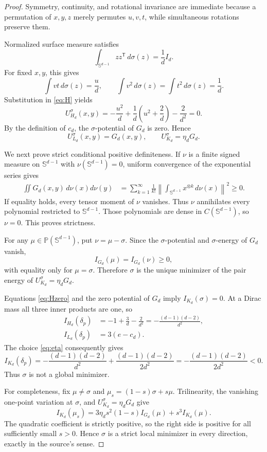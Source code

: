 \documentclass[11pt]{article}
\newcommand{\Sph}{\mathbb S^{d-1}}
\newcommand{\Pmeas}{\mathbb P}
\begin{document}
\begin{proof}
Symmetry, continuity, and rotational invariance are immediate because a
permutation of $x,y,z$ merely permutes $u,v,t$, while simultaneous rotations
preserve them.

Normalized surface measure satisfies
\[
 \int_{\Sph}zz^{\mathsf T}\,d\sigma(z)=\frac1dI_d.
\]
For fixed $x,y$, this gives
\[
 \int vt\,d\sigma(z)=\frac ud,
 \qquad
 \int v^2\,d\sigma(z)=\int t^2\,d\sigma(z)=\frac1d.
\]
Substitution in \eqref{eq:H} yields
\begin{equation}\label{eq:Hzero}
 U_{H_d}^\sigma(x,y)
 =-\frac{u^2}{d}+\frac1d\left(u^2+\frac2d\right)
  -\frac2{d^2}=0.
\end{equation}
By the definition of $c_d$, the $\sigma$-potential of $G_d$ is zero.  Hence
\[
 U_{L_d}^\sigma(x,y)=G_d(x,y),
 \qquad U_{K_d}^\sigma=\eta_dG_d.
\]

We next prove strict conditional positive definiteness.  If $\nu$ is a finite
signed measure on $\Sph$ with $\nu(\Sph)=0$, uniform convergence of the
exponential series gives
\begin{align}\label{eq:tensors}
 \iint G_d(x,y)\,d\nu(x)d\nu(y)
 &=\sum_{k=1}^{\infty}\frac1{k!}
   \left\|\int_{\Sph}x^{\otimes k}\,d\nu(x)\right\|^2\ge0.
\end{align}
If equality holds, every tensor moment of $\nu$ vanishes.  Thus $\nu$
annihilates every polynomial restricted to $\Sph$.  Those polynomials are
dense in $C(\Sph)$, so $\nu=0$.  This proves strictness.

For any $\mu\in\Pmeas(\Sph)$, put $\nu=\mu-\sigma$.  Since the
$\sigma$-potential and $\sigma$-energy of $G_d$ vanish,
\[
 I_{G_d}(\mu)=I_{G_d}(\nu)\ge0,
\]
with equality only for $\mu=\sigma$.  Therefore $\sigma$ is the unique
minimizer of the pair energy of $U_{K_d}^\sigma=\eta_dG_d$.

Equations \eqref{eq:Hzero} and the zero potential of $G_d$ imply
$I_{K_d}(\sigma)=0$.  At a Dirac mass all three inner products are one, so
\begin{align*}
 I_{H_d}(\delta_p)
 &=-1+\frac3d-\frac2{d^2}
   =-\frac{(d-1)(d-2)}{d^2},\\
 I_{L_d}(\delta_p)&=3(e-c_d).
\end{align*}
The choice \eqref{eq:eta} consequently gives
\[
 I_{K_d}(\delta_p)
 =-\frac{(d-1)(d-2)}{d^2}
   +\frac{(d-1)(d-2)}{2d^2}
 =-\frac{(d-1)(d-2)}{2d^2}<0.
\]
Thus $\sigma$ is not a global minimizer.

For completeness, fix $\mu\ne\sigma$ and
$\mu_s=(1-s)\sigma+s\mu$.  Trilinearity, the vanishing one-point variation
at $\sigma$, and $U_{K_d}^\sigma=\eta_dG_d$ give
\begin{equation}\label{eq:local}
 I_{K_d}(\mu_s)
 =3\eta_d s^2(1-s)I_{G_d}(\mu)+s^3 I_{K_d}(\mu).
\end{equation}
The quadratic coefficient is strictly positive, so the right side is positive
for all sufficiently small $s>0$.  Hence $\sigma$ is a strict local minimizer
in every direction, exactly in the source's sense.
\end{proof}
\end{document}
